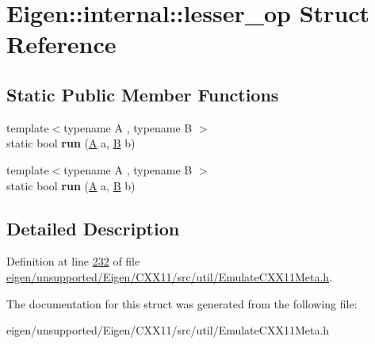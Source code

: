 \hypertarget{struct_eigen_1_1internal_1_1lesser__op}{}\section{Eigen\+:\+:internal\+:\+:lesser\+\_\+op Struct Reference}
\label{struct_eigen_1_1internal_1_1lesser__op}
\subsection*{Static Public Member Functions}
\begin{DoxyCompactItemize}
\item 
\mbox{\label{struct_eigen_1_1internal_1_1lesser__op_ac40cb4f2829faa60455504f3b2eca406}} 
{\footnotesize template$<$typename A , typename B $>$ }\\static bool {\bfseries run} (\hyperlink{group___core___module_class_eigen_1_1_matrix}{A} a, \hyperlink{group___core___module_class_eigen_1_1_matrix}{B} b)
\item 
\mbox{\label{struct_eigen_1_1internal_1_1lesser__op_ac40cb4f2829faa60455504f3b2eca406}} 
{\footnotesize template$<$typename A , typename B $>$ }\\static bool {\bfseries run} (\hyperlink{group___core___module_class_eigen_1_1_matrix}{A} a, \hyperlink{group___core___module_class_eigen_1_1_matrix}{B} b)
\end{DoxyCompactItemize}


\subsection{Detailed Description}


Definition at line \hyperlink{eigen_2unsupported_2_eigen_2_c_x_x11_2src_2util_2_emulate_c_x_x11_meta_8h_source_l00232}{232} of file \hyperlink{eigen_2unsupported_2_eigen_2_c_x_x11_2src_2util_2_emulate_c_x_x11_meta_8h_source}{eigen/unsupported/\+Eigen/\+C\+X\+X11/src/util/\+Emulate\+C\+X\+X11\+Meta.\+h}.



The documentation for this struct was generated from the following file\+:\begin{DoxyCompactItemize}
\item 
eigen/unsupported/\+Eigen/\+C\+X\+X11/src/util/\+Emulate\+C\+X\+X11\+Meta.\+h\end{DoxyCompactItemize}
